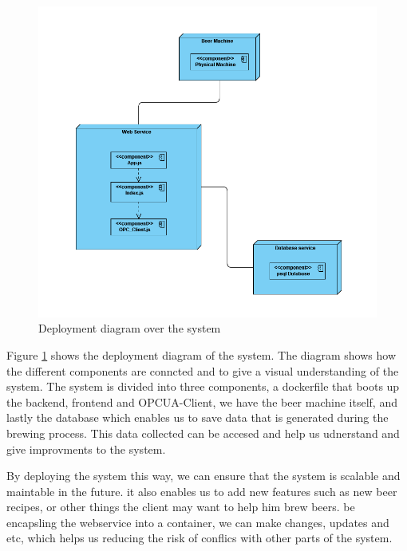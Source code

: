 \begin{center}
    \centering
    \begin{figure}[H]
        \includegraphics[width=1\textwidth]{img/Deployment_diagram.png}
        \caption{Deployment diagram over the system}
        \label{fig:Deployment_diagram}
    \end{figure}
\end{center}
Figure \ref{fig:Deployment_diagram} shows the deployment diagram of the system. The diagram shows how the different components are conncted and to give a visual understanding of the system. The system is divided into three components, a dockerfile that boots up the backend, frontend and OPCUA-Client, we have the beer machine itself, and lastly the database which enables us to save data that is generated during the brewing process. This data collected can be accesed and help us udnerstand and give improvments to the system. \newline

By deploying the system this way, we can ensure that the system is scalable and maintable in the future. it also enables us to add new features such as new beer recipes, or other things the client may want to help him brew beers. be encapsling the webservice into a container, we can make changes, updates and etc, which helps us reducing the risk of conflics with other parts of the system. \newline


